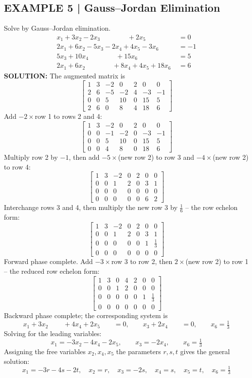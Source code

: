 \documentclass{article}
\theoremstyle{mystyle}
\begin{document}
\subsection*{EXAMPLE 5 | Gauss--Jordan Elimination}
Solve by Gauss--Jordan elimination.
\[
\begin{aligned}
x_1+3x_2-2x_3\qquad\qquad+2x_5\qquad\qquad&=0\\
2x_1+6x_2-5x_3-2x_4+4x_5-3x_6&=-1\\
5x_3+10x_4\qquad\qquad+15x_6&=5\\
2x_1+6x_2\qquad\qquad+8x_4+4x_5+18x_6&=6
\end{aligned}
\]
\textbf{SOLUTION:} The augmented matrix is
\[
\begin{bmatrix}1&3&-2&0&2&0&0\\2&6&-5&-2&4&-3&-1\\0&0&5&10&0&15&5\\2&6&0&8&4&18&6\end{bmatrix}
\]
Add $-2\times$row 1 to rows 2 and 4:
\[
\begin{bmatrix}1&3&-2&0&2&0&0\\0&0&-1&-2&0&-3&-1\\0&0&5&10&0&15&5\\0&0&4&8&0&18&6\end{bmatrix}
\]
Multiply row 2 by $-1$, then add $-5\times$(new row 2) to row 3 and $-4\times$(new row 2) to row 4:
\[
\begin{bmatrix}1&3&-2&0&2&0&0\\0&0&1&2&0&3&1\\0&0&0&0&0&0&0\\0&0&0&0&0&6&2\end{bmatrix}
\]
Interchange rows 3 and 4, then multiply the new row 3 by $\tfrac16$ -- the row echelon form:
\[
\begin{bmatrix}1&3&-2&0&2&0&0\\0&0&1&2&0&3&1\\0&0&0&0&0&1&\tfrac13\\0&0&0&0&0&0&0\end{bmatrix}
\]
Forward phase complete. Add $-3\times$row 3 to row 2, then $2\times$(new row 2) to row 1 -- the reduced row echelon form:
\[
\begin{bmatrix}1&3&0&4&2&0&0\\0&0&1&2&0&0&0\\0&0&0&0&0&1&\tfrac13\\0&0&0&0&0&0&0\end{bmatrix}
\]
Backward phase complete; the corresponding system is
\[
x_1+3x_2\qquad\ +4x_4+2x_5\qquad=0,\qquad x_3+2x_4\qquad=0,\qquad x_6=\tfrac13 \tag{3}
\]
Solving for the leading variables:
\[
x_1=-3x_2-4x_4-2x_5,\qquad x_3=-2x_4,\qquad x_6=\tfrac13
\]
Assigning the free variables $x_2,x_4,x_5$ the parameters $r,s,t$ gives the general solution:
\[
x_1=-3r-4s-2t,\quad x_2=r,\quad x_3=-2s,\quad x_4=s,\quad x_5=t,\quad x_6=\tfrac13
\]
\end{document}
